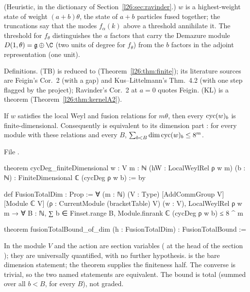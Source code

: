 \begin{physics}
(Heuristic, in the dictionary of Section~\ref{l26:sec:ravinder}.) $w$ is a highest-weight state of weight $(a+b)\theta$, the state
of $a+b$ particles fused together; the truncations say that the modes $f_\alpha(k)$ above a threshold annihilate it.
The threshold for $f_\theta$ distinguishes the $a$ factors that carry the Demazure module $D(1,\theta)=\ltwentysixg\oplus\C$
(two units of degree for $f_\theta$) from the $b$ factors in the adjoint representation (one unit).
\end{physics}

\begin{status}
Definitions. (TB) is reduced to  (Theorem~\ref{l26:thm:finite}); its literature sources are Feigin's Cor.~2
(with a gap) and Kus--Littelmann's Thm.~4.2 (with one step flagged by the project); Ravinder's Cor.~2 at $a=0$ quotes Feigin. (KL) is a theorem (Theorem~\ref{l26:thm:kernelA2}).
\end{status}

\begin{theorem}\label{l26:thm:finite}
If $w$ satisfies the local Weyl and fusion relations for $m\theta$, then every $\operatorname{cyc}(w)_b$ is
finite-dimensional. Consequently  is equivalent to its dimension part : for
every module with these relations and every $B$, $\sum_{b<B}\dim\operatorname{cyc}(w)_b\le8^m$.
\end{theorem}
\noindent File .
\begin{leancode}
theorem cycDeg_finiteDimensional {w : V} {m : ℕ} (hW : LocalWeylRel ρ w m) (b : ℕ) :
    FiniteDimensional ℂ (cycDeg ρ w b) := by

def FusionTotalDim : Prop :=
  ∀ (m : ℕ) (V : Type) [AddCommGroup V] [Module ℂ V] (ρ : CurrentModule (bracketTable) V) (w : V),
    LocalWeylRel ρ w m → ∀ B : ℕ, ∑ b ∈ Finset.range B, Module.finrank ℂ (cycDeg ρ w b) ≤ 8 ^ m

theorem fusionTotalBound_of_dim (h : FusionTotalDim) : FusionTotalBound :=
\end{leancode}

\begin{dictionary}
In  the module $V$ and the action  are
section variables ( at the head of the section ); they are
universally quantified, with no further hypothesis.  is the bare dimension statement; the theorem
 supplies the finiteness half. The converse is trivial, so the two named statements are
equivalent. The bound is total (summed over all $b<B$, for every $B$), not graded.
\end{dictionary}

